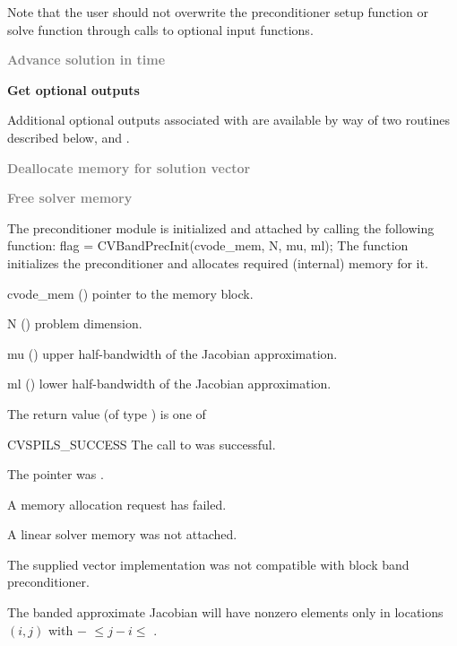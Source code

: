 \begin{Steps}
  Note that the user should not overwrite the preconditioner setup function
  or solve function through calls to  optional input functions.

\item
  \textcolor{gray}{\bf Advance solution in time}

\item
  {\bf Get optional outputs}

  Additional optional outputs associated with {\cvbandpre} are available by 
  way of two routines described below,
   and .

\item
  \textcolor{gray}{\bf Deallocate memory for solution vector}

\item
  \textcolor{gray}{\bf Free solver memory}
  
\end{Steps}
The {\cvbandpre} preconditioner module is initialized and attached
by calling the following function:
{
  flag = CVBandPrecInit(cvode\_mem, N, mu, ml);
}
{
  The function  initializes the {\cvbandpre} preconditioner
  and allocates required (internal) memory for it.
}
{
  \begin{args}
  \item[cvode\_mem] ()
    pointer to the {\cvode} memory block.
  \item[N] ()
    problem dimension.
  \item[mu] ()
    upper half-bandwidth of the Jacobian approximation.
  \item[ml] ()
    lower half-bandwidth of the Jacobian approximation.
  \end{args}
}
{
  The return value  (of type ) is one of
  \begin{args}
  \item[CVSPILS\_SUCCESS]
    The call to  was successful.
  \item[\id{CVSPILS\_MEM\_NULL}] 
    The  pointer was .
  \item[\Id{CVSPILS\_MEM\_FAIL}]
    A memory allocation request has failed.
  \item[\Id{CVSPILS\_LMEM\_NULL}]
    A {\cvspils} linear solver memory was not attached.
  \item[\Id{CVSPILS\_ILL\_INPUT}]
    The supplied vector implementation was not compatible with block band preconditioner.
  \end{args}
}
{
  The banded approximate Jacobian will have nonzero elements only in locations
  $(i,j)$ with $-$ $\leq j-i \leq$ .
}

